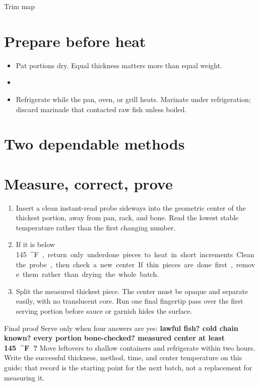 \begin{teloscard}{Trim map}
\TrimNotes
\end{teloscard}

\section{Prepare before heat}
\begin{itemize}
\item Pat portions dry. Equal thickness matters more than equal weight.
\item \Prep
\item Refrigerate while the pan, oven, or grill heats. Marinate under
refrigeration; discard marinade that contacted raw fish unless boiled.
\end{itemize}

\Needspace{.48\textheight}
\section{Two dependable methods}
\CookingPlate
\begin{teloscard}{\CookOne}
\CookOneText
\end{teloscard}
\begin{teloscard}{\CookTwo}
\CookTwoText
\end{teloscard}

\section{Measure, correct, prove}
\begin{enumerate}
\item Insert a clean instant-read probe sideways into the geometric center of
the thickest portion, away from pan, rack, and bone. Read the lowest stable
temperature rather than the first changing number.
\item If it is below \qty{145}{^\circ F}, return only underdone pieces to heat
in short increments. Clean the probe, then check a new center. If thin pieces
are done first, remove them rather than drying the whole batch.
\item Split the measured thickest piece. The center must be opaque and separate
easily, with no translucent core. Run one final fingertip pass over the first
serving portion before sauce or garnish hides the surface.
\end{enumerate}

\begin{telospanel}{Final proof}
Serve only when four answers are yes: \textbf{lawful fish? cold chain known?
every portion bone-checked? measured center at least \qty{145}{^\circ F}?}
Move leftovers to shallow containers and refrigerate within two hours. Write
the successful thickness, method, time, and center temperature on this guide;
that record is the starting point for the next batch, not a replacement for
measuring it.
\end{telospanel}

